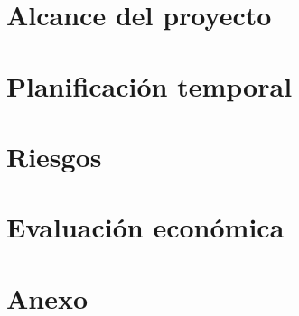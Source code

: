 \documentclass{report}
\begin{document}
    \chapter{Alcance del proyecto}
    \chapter{Planificación temporal}
    \chapter{Riesgos}
    \chapter{Evaluación económica}
    \chapter*{Anexo}
\end{document}

